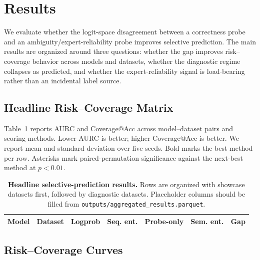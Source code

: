 \section{Results}
\label{sec:results}

We evaluate whether the logit-space disagreement between a correctness probe
and an ambiguity/expert-reliability probe improves selective prediction. The
main results are organized around three questions: whether the gap improves
risk--coverage behavior across models and datasets, whether the diagnostic
regime collapses as predicted, and whether the expert-reliability signal is
load-bearing rather than an incidental label source.

\subsection{Headline Risk--Coverage Matrix}
\label{sec:results-headline}

Table~\ref{tab:headline-matrix} reports AURC and Coverage@Acc across
model--dataset pairs and scoring methods. Lower AURC is better; higher
Coverage@Acc is better. We report mean and standard deviation over five seeds.
Bold marks the best method per row. Asterisks mark paired-permutation
significance against the next-best method at $p < 0.01$.

\begin{table}[t]
\centering
\caption{\textbf{Headline selective-prediction results.} Rows are organized
with showcase datasets first, followed by diagnostic datasets. Placeholder
columns should be filled from \texttt{outputs/aggregated\_results.parquet}.}
\label{tab:headline-matrix}
\begin{tabular}{llrrrrr}
\toprule
Model & Dataset & Logprob & Seq. ent. & Probe-only & Sem. ent. & Gap \\
\midrule
\midrule
\bottomrule
\end{tabular}
\end{table}

\subsection{Risk--Coverage Curves}
\label{sec:results-rc-curve}


